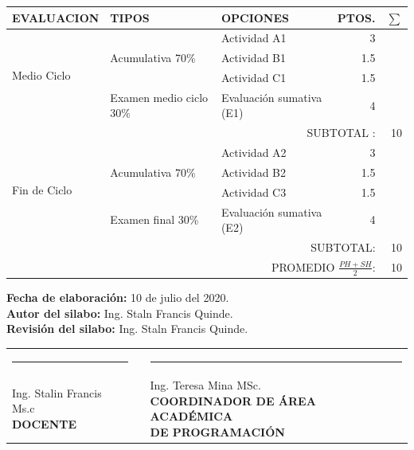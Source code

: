\documentclass[a4paper,12pt,spanish]{article}
\begin{document}
\begin{tabular}[H]{|m{2.5cm}|m{4cm}|m{5cm}|r|r|}
  \hline
  \rowcolor{green!10}
  EVALUACION & TIPOS & OPCIONES & PTOS. & $\sum$ \\ \hline \cline{1-4}
   \multirow{4}{*}{Medio Ciclo} & \multirow{3}{*}{Acumulativa 70\%} & Actividad A1 & 3 \\ \cline{3-3}
             &                                    & Actividad B1 & 1.5 \\ \cline{3-3}
             &                                    & Actividad C1 & 1.5\\ \cline{2-3}
             &Examen medio ciclo 30\% & Evaluación sumativa (E1) &4 \\ \hline 
  \multicolumn{4}{r}{SUBTOTAL :} & 10 \\ \hline
   \multirow{4}{*}{Fin de Ciclo} & \multirow{3}{*}{Acumulativa 70\%} & Actividad A2 & 3 \\ \cline{3-3}
             &                                    & Actividad B2 & 1.5 \\ \cline{3-3}
             &                                    & Actividad C3 & 1.5\\ \cline{2-3}
             &Examen final 30\% & Evaluación sumativa (E2) &4 \\ \hline
  \multicolumn{4}{|r}{SUBTOTAL:} & 10 \\ \hline
  \multicolumn{4}{|r}{PROMEDIO $ \frac{PH+SH}{2} $:} & 10 \\ \hline

  
\end{tabular}



\setlength{\bibleftmargin}{.125in}
\setlength{\bibindent}{-\bibleftmargin}


\newpage
\vspace{0.3cm}


\noindent \textbf{Fecha de elaboración:} 10 de julio del 2020. \\
\textbf{Autor del silabo: } Ing. Staln Francis Quinde. \\
\textbf{Revisión del silabo: } Ing. Staln Francis Quinde. \\

\vspace{4cm}

\vspace{3cm}
\begin{center}
\begin{tabular}[H]{m{8cm}lm{8cm}}
  \rule{7cm}{0.4pt}& &\rule{7cm}{0.4pt} \\
  \makecell[c]{Ing. Stalin Francis Ms.c\\\textbf{ DOCENTE}}  & &\makecell[c]{Ing. Teresa Mina  MSc. \\ \textbf{COORDINADOR DE ÁREA ACADÉMICA} \\ \textbf{DE PROGRAMACIÓN}} \\ 
\end{tabular}
\end{center}
\end{document}
